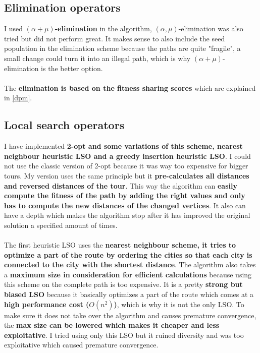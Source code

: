 \documentclass[a4paper,10pt]{article}
\begin{document}
\subsection{Elimination operators}
I used \textbf{$(\alpha + \mu)$-elimination} in the algorithm, $(\alpha, \mu)$-elimination was also tried but did not perform great. It makes sense to also include the seed population in the elimination scheme because the paths are quite "fragile", a small change could turn it into an illegal path, which is why $(\alpha + \mu)$-elimination is the better option. 
\\\\
The \textbf{elimination is based on the fitness sharing scores} which are explained in \ref{dpm}.

\subsection{Local search operators}
\label{LSO}
I have implemented \textbf{2-opt and some variations of this scheme, nearest neighbour heuristic LSO and a greedy insertion heuristic LSO}. I could not use the classic version of 2-opt because it was way too expensive for bigger tours. My version uses the same principle but it \textbf{pre-calculates all distances and reversed distances of the tour}. This way the algorithm can \textbf{easily compute the  fitness of the path by adding the right values and only has to compute the new distances of the changed vertices}. It also can have a depth which makes the algorithm stop after it has improved the original solution a specified amount of times.
\\\\
The first heuristic LSO uses the \textbf{nearest neighbour scheme, it tries to optimize a part of the route by ordering the cities so that each city is connected to the city with the shortest distance}. The algorithm also takes a \textbf{maximum size in consideration for efficient calculations} because using this scheme on the complete path is too expensive. It is a pretty \textbf{strong but biased LSO} because it basically optimizes a part of the route which comes at a \textbf{high performance cost ($O(n^2)$)}, which is why it is not the only LSO. To make sure it does not take over the algorithm and causes premature convergence, the \textbf{max size can be lowered which makes it cheaper and less exploitative}. I tried using only this LSO but it ruined diversity and was too exploitative which caused premature convergence.
\\\\
\end{document}
